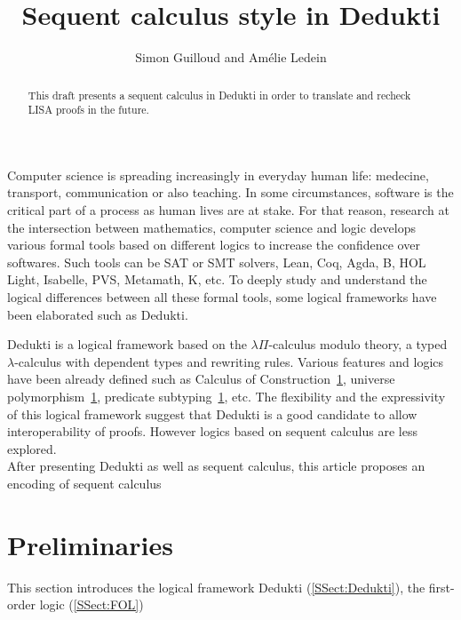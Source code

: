 \documentclass{article}
\title{Sequent calculus style in Dedukti}
\author{Simon Guilloud and Amélie Ledein}
\date{}
\begin{document}
	\maketitle

	\begin{abstract}
		This draft presents a sequent calculus in Dedukti in order to translate and recheck LISA proofs in the future.
	\end{abstract}

	Computer science is spreading increasingly in everyday human life: medecine, transport, communication or also teaching. In some circumstances, software is the critical part of a process as human lives are at stake.
	For that reason, research at the intersection between mathematics, computer science and logic develops various formal tools
	based on different logics to increase the confidence over softwares.
	Such tools can be SAT or SMT solvers, 
	Lean, Coq, Agda, B, HOL Light, Isabelle, PVS, Metamath, K, etc.
	To deeply study and understand the logical differences between all these formal tools, some logical frameworks have been elaborated such as Dedukti.

	Dedukti is a logical framework based on the $\lambda\Pi$-calculus modulo theory, a typed $\lambda$-calculus with dependent types and rewriting rules.
	Various features and logics have been already defined such as Calculus of Construction~\ref{}, universe polymorphism~\ref{}, predicate subtyping~\ref{}, etc.
	The flexibility and the expressivity of this logical framework suggest that Dedukti is a good candidate to allow interoperability of proofs.
	However logics based on sequent calculus are less explored. \\



	After presenting Dedukti as well as sequent calculus, this article proposes an encoding of sequent calculus 

\newpage

	\section{Preliminaries}

	This section introduces the logical framework Dedukti (\autoref{SSect:Dedukti}), the first-order logic (\autoref{SSect:FOL})
\end{document}
